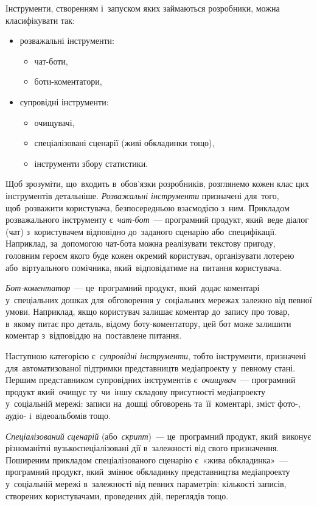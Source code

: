\documentclass[
	a4paper,
	oneside,
	BCOR = 10mm,
	DIV = 12,
	12pt,
	headings = normal,
]{scrartcl}
\begin{document}
		Інструменти, створенням і~запуском яких займаються розробники, можна класифікувати так:
		\begin{itemize}
			\item розважальні інструменти:
				\begin{itemize}
					\item чат-боти,
					\item боти-коментатори,
				\end{itemize}
			\item супровідні інструменти:
				\begin{itemize}
					\item очищувачі,
					\item спеціалізовані сценарії (живі обкладинки тощо),
					\item інструменти збору статистики.
				\end{itemize}
		\end{itemize}
		Щоб зрозуміти, що~входить в~обов'язки розробників, розглянемо кожен клас цих інструментів детальніше. \emph{Розважальні інструменти} призначені для~того, щоб~розважити користувача, безпосередньою взаємодією з~ним. Прикладом розважального інструменту є~\emph{чат-бот}~— програмний продукт, який~веде діалог (чат) з~користувачем відповідно до~заданого сценарію або~специфікації. Наприклад, за~допомогою чат-бота можна реалізувати текстову пригоду, головним героєм якого буде кожен окремий користувач, організувати лотерею або~віртуального помічника, який~відповідатиме на~питання користувача.

		\emph{Бот-коментатор}~— це~програмний продукт, який~додає коментарі у~спеціальних дошках для~обговорення у~соціальних мережах залежно від певної умови. Наприклад, якщо користувач залишає коментар до~запису про товар, в~якому питає про деталь, відому боту-коментатору, цей бот може залишити коментар з~відповіддю на~поставлене питання. 

		Наступною категорією є~\emph{супровідні інструменти}, тобто інструменти, призначені для~автоматизованої підтримки представництв медіапроекту у~певному стані. Першим представником супровідних інструментів є~\emph{очищувач}~— програмний продукт який~очищує ту~чи~іншу складову присутності медіапроекту у~соціальній мережі: записи на~дошці обговорень та~її~коментарі, зміст фото-, аудіо- і~відеоальбомів тощо.

		\emph{Спеціалізований сценарій} (або~\emph{скрипт})~— це~програмний продукт, який~виконує різноманітні вузькоспеціалізовані дії в~залежності від свого призначення. Поширеним прикладом спеціалізованого сценарію є~«жива обкладинка»~— програмний продукт, який~змінює обкладинку представництва медіапроекту у~соціальній мережі в~залежності від певних параметрів: кількості записів, створених користувачами, проведених дій, переглядів тощо.
\end{document}
